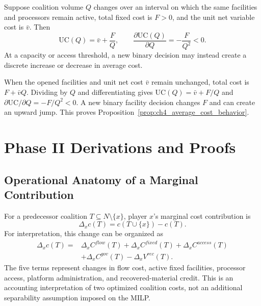 \begin{proposition}
\label{prop:ch4_average_cost_behavior}
Suppose coalition volume $Q$ changes over an interval on which the same
facilities and processors remain active, total fixed cost is $F>0$, and the
unit net variable cost is $\bar v$. Then
\begin{equation}
\label{eq:ch4_average_cost_behavior}
\mathrm{UC}(Q)=\bar v+\frac{F}{Q},
\qquad
\frac{\partial\mathrm{UC}(Q)}{\partial Q}=-\frac{F}{Q^2}<0.
\end{equation}
At a capacity or access threshold, a new binary decision may instead create a
discrete increase or decrease in average cost.
\end{proposition}

When the opened facilities and unit net cost $\bar v$ remain unchanged, total
cost is $F+\bar vQ$. Dividing by $Q$ and differentiating gives
$\mathrm{UC}(Q)=\bar v+F/Q$ and
$\partial\mathrm{UC}/\partial Q=-F/Q^2<0$. A new binary facility decision
changes $F$ and can create an upward jump. This proves
Proposition~\ref{prop:ch4_average_cost_behavior}.

\section{Phase II Derivations and Proofs}

\subsection{Operational Anatomy of a Marginal Contribution}

For a predecessor coalition $T\subseteq N\setminus\{x\}$, player $x$'s
marginal cost contribution is
\begin{equation}
\label{eq:ch4_marginal_cost}
\Delta_x c(T)=c(T\cup\{x\})-c(T).
\end{equation}
For interpretation, this change can be organized as
\begin{equation}
\label{eq:ch4_marginal_decomposition}
\begin{aligned}
\Delta_x c(T)=&
\Delta_x C^{flow}(T)
+\Delta_x C^{fixed}(T)
+\Delta_x C^{access}(T)\\
&+\Delta_x C^{gov}(T)
-\Delta_x V^{rec}(T).
\end{aligned}
\end{equation}
The five terms represent changes in flow cost, active fixed facilities,
processor access, platform administration, and recovered-material credit.
This is an accounting interpretation of two optimized coalition costs, not an
additional separability assumption imposed on the MILP.

